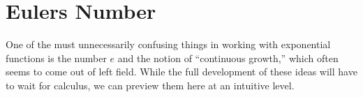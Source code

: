 \section{Eulers Number}
One of the must unnecessarily confusing things in working with exponential functions is the number $e$ and the notion of ``continuous growth,'' which often seems to come out of left field. While the full development of these ideas will have to wait for calculus, we can preview them here at an intuitive level.

 
 
 
 
 
